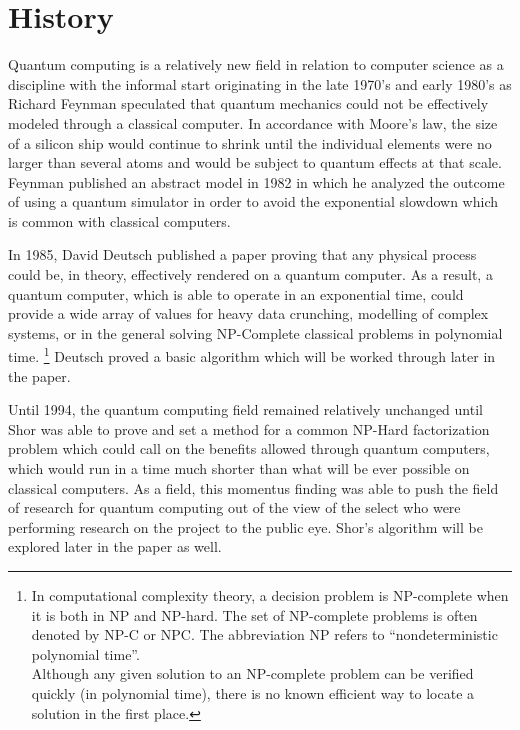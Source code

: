 \documentclass[12pt]{article}
\begin{document}
\newpage

\tableofcontents

\newpage
{}

\section{History}

Quantum computing is a relatively new field in relation to computer science as a discipline with the informal start originating in the late 1970's and early 1980's as Richard Feynman speculated that quantum mechanics could not be effectively modeled through a classical computer. In accordance with Moore's law, the size of a silicon ship would continue to shrink until the individual elements were no larger than several atoms and would be subject to quantum effects at that scale. Feynman published an abstract model in 1982 in which he analyzed the outcome of using a quantum simulator in order to avoid the exponential slowdown which is common with classical computers.\cite{web}\par
In 1985, David Deutsch published a paper proving that any physical process could be, in theory, effectively rendered on a quantum computer. As a result, a quantum computer, which is able to operate in an exponential time, could provide a wide array of values for heavy data crunching, modelling of complex systems, or in the general solving NP-Complete classical problems in polynomial time.
\footnote{In computational complexity theory, a decision problem is NP-complete when it is both in NP and NP-hard. The set of NP-complete problems is often denoted by NP-C or NPC. The abbreviation NP refers to ``nondeterministic polynomial time''.\\Although any given solution to an NP-complete problem can be verified quickly (in polynomial time), there is no known efficient way to locate a solution in the first place.}
Deutsch proved a basic algorithm which will be worked through later in the paper. \par
Until 1994, the quantum computing field remained relatively unchanged until Shor was able to prove and set a method for a common NP-Hard factorization problem which could call on the benefits allowed through quantum computers, which would run in a time much shorter than what will be ever possible on classical computers.\cite{web} As a field, this momentus finding was able to push the field of research for quantum computing out of the view of the select who were performing research on the project to the public eye. Shor's algorithm will be explored later in the paper as well.\par
\end{document}
